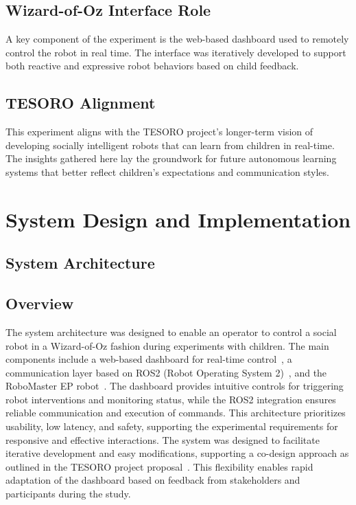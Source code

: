 \documentclass[a4paper]{usiinfbachelorproject}
\begin{document}
\subsection*{\textbf{Wizard-of-Oz Interface Role}}
A key component of the experiment is the web-based dashboard used to remotely control the robot in real time.
The interface was iteratively developed to support both reactive and expressive robot behaviors based on child feedback.

\subsection*{\textbf{TESORO Alignment}}
This experiment aligns with the TESORO project's longer-term vision of developing socially intelligent robots that can learn from children in real-time.
The insights gathered here lay the groundwork for future autonomous learning systems that better reflect children's expectations and communication styles.

\section{\textbf{System Design and Implementation}}\label{sec:system}

\subsection{\textbf{System Architecture}}
\subsection*{\textbf{Overview}}
The system architecture was designed to enable an operator to control a social robot in a Wizard-of-Oz fashion during experiments with children.
The main components include a web-based dashboard for real-time control~\cite{frovaaa2025hogwarts}, a communication layer based on ROS2 (Robot Operating System 2)~\cite{ros2, frovaaa2025robomaster, frovaaa2025robomasterhri}, and the RoboMaster EP robot~\cite{djirobomasterep}.
The dashboard provides intuitive controls for triggering robot interventions and monitoring status, while the ROS2 integration ensures reliable communication and execution of commands.
This architecture prioritizes usability, low latency, and safety, supporting the experimental requirements for responsive and effective interactions.
The system was designed to facilitate iterative development and easy modifications, supporting a co-design approach as outlined in the TESORO project proposal~\cite{landoni2025tesoro}.
This flexibility enables rapid adaptation of the dashboard based on feedback from stakeholders and participants during the study.
\end{document}
